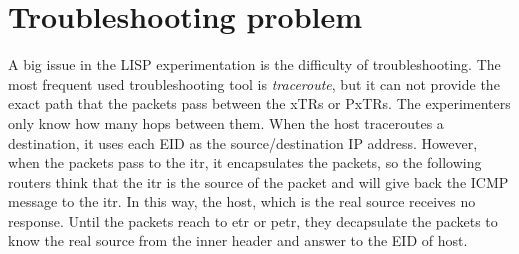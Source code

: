 \section{Troubleshooting problem}
\label{sec:troubleshooting}
A big issue in the LISP experimentation is the difficulty of troubleshooting. The most frequent used troubleshooting tool is \emph{traceroute}, but it can not provide the exact path that the packets pass between the xTRs or PxTRs. The experimenters only know how many hops between them. When the host traceroutes a destination, it uses each EID as the source/destination IP address. However, when the packets pass to the \acrshort{itr}, it encapsulates the packets, so the following routers think that the \acrshort{itr} is the source of the packet and will give back the ICMP message to the \acrshort{itr}. In this way, the host, which is the real source receives no response. Until the packets reach to \acrshort{etr} or \acrshort{petr}, they decapsulate the packets to know the real source from the inner header and answer to the EID of host.


